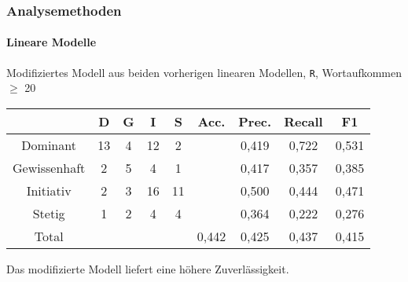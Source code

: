 \begin{frame}
\frametitle{Analysemethoden}
\framesubtitle{Lineare Modelle}
\begin{center}
Modifiziertes Modell aus beiden vorherigen linearen Modellen, \texttt{R}, Wortaufkommen $\geq$ 20\\
\bigskip
\begin{tabular}{|c|c|c|c|c|c|c|c|c|}
\hline
				& D 	& G	& I & S	& Acc.	& Prec. & Recall	& F1\\
\hline
Dominant 		& 13	& 4 & 12& 2 &      	& 0,419 & 0,722 	& 0,531\\
Gewissenhaft 	& 2 	& 5 & 4 & 1 & 		& 0,417 & 0,357 	& 0,385\\
Initiativ 		& 2 	& 3	& 16& 11& 		& 0,500	& 0,444 	& 0,471\\
Stetig 			& 1 	& 2 & 4	& 4 & 		& 0,364	& 0,222 	& 0,276\\
\hline
Total 			& 		& 	& 	& 	& 0,442	& 0,425 & 0,437	  	& 0,415\\
\hline
\end{tabular}
\end{center}
 \vspace{12pt}
 
Das modifizierte Modell liefert eine höhere Zuverlässigkeit.
\end{frame}
